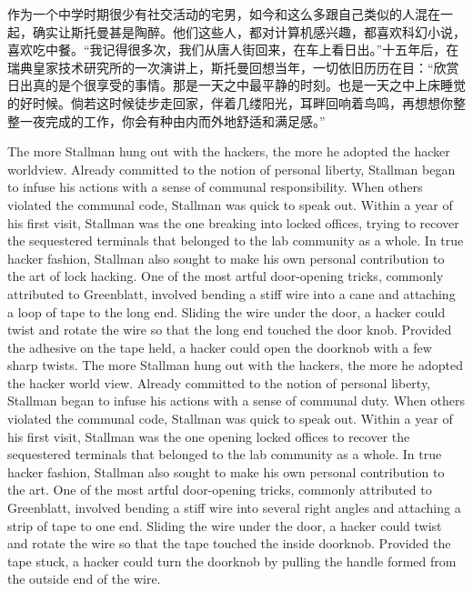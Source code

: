 \ifdefined\chs
作为一个中学时期很少有社交活动的宅男，如今和这么多跟自己类似的人混在一起，确实让斯托曼甚是陶醉。他们这些人，都对计算机感兴趣，都喜欢科幻小说，喜欢吃中餐。``我记得很多次，我们从唐人街回来，在车上看日出。''十五年后，在瑞典皇家技术研究所的一次演讲上，斯托曼回想当年，一切依旧历历在目：``欣赏日出真的是个很享受的事情。那是一天之中最平静的时刻。也是一天之中上床睡觉的好时候。倘若这时候徒步走回家，伴着几缕阳光，耳畔回响着鸟鸣，再想想你整整一夜完成的工作，你会有种由内而外地舒适和满足感。''
\fi

\ifdefined\eng
\ifdefined\vone
The more Stallman hung out with the hackers, the more he adopted the hacker worldview. Already committed to the notion of personal liberty, Stallman began to infuse his actions with a sense of communal responsibility. When others violated the communal code, Stallman was quick to speak out. Within a year of his first visit, Stallman was the one breaking into locked offices, trying to recover the sequestered terminals that belonged to the lab community as a whole. In true hacker fashion, Stallman also sought to make his own personal contribution to the art of lock hacking. One of the most artful door-opening tricks, commonly attributed to Greenblatt, involved bending a stiff wire into a cane and attaching a loop of tape to the long end. Sliding the wire under the door, a hacker could twist and rotate the wire so that the long end touched the door knob. Provided the adhesive on the tape held, a hacker could open the doorknob with a few sharp twists.
\fi
\ifdefined\vtwo
The more Stallman hung out with the hackers, the more he adopted the hacker world view. Already committed to the notion of personal liberty, Stallman began to infuse his actions with a sense of communal duty. When others violated the communal code, Stallman was quick to speak out. Within a year of his first visit, Stallman was the one opening locked offices to recover the sequestered terminals that belonged to the lab community as a whole. In true hacker fashion, Stallman also sought to make his own personal contribution to the art. One of the most artful door-opening tricks, commonly attributed to Greenblatt, involved bending a stiff wire into several right angles and attaching a strip of tape to one end. Sliding the wire under the door, a hacker could twist and rotate the wire so that the tape touched the inside doorknob. Provided the tape stuck, a hacker could turn the doorknob by pulling the handle formed from the outside end of the wire.
\fi
\fi

